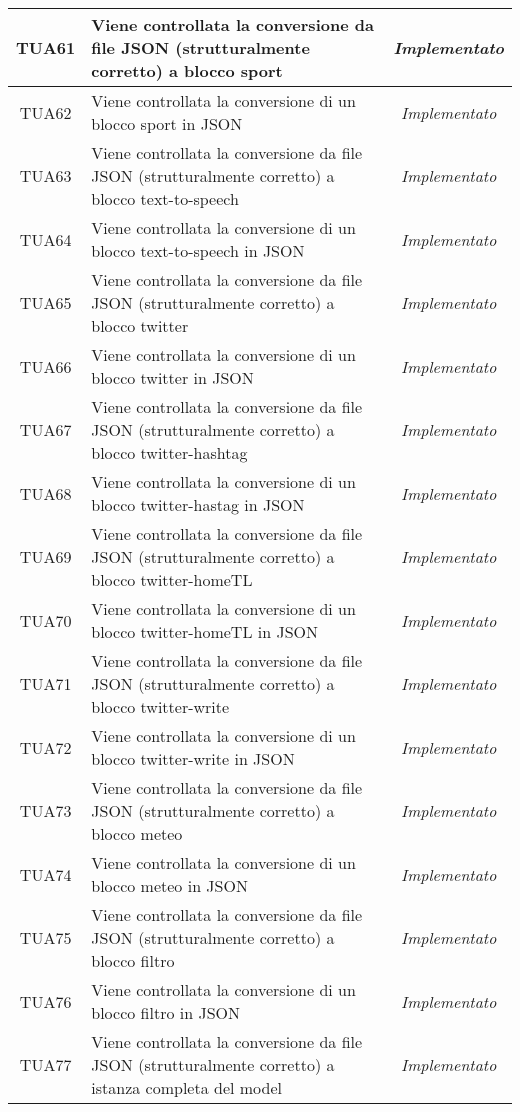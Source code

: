 \begin{longtable}{|c|m{12em}|c|}
TUA61 & Viene controllata la conversione da file JSON (strutturalmente corretto) a blocco sport& \textit{Implementato}\\ \hline
TUA62 & Viene controllata la conversione di un blocco sport in JSON& \textit{Implementato}\\ \hline
TUA63 & Viene controllata la conversione da file JSON (strutturalmente corretto) a blocco text-to-speech& \textit{Implementato}\\ \hline
TUA64 & Viene controllata la conversione di un blocco text-to-speech in JSON& \textit{Implementato}\\ \hline
TUA65 & Viene controllata la conversione da file JSON (strutturalmente corretto) a blocco twitter& \textit{Implementato}\\ \hline
TUA66 & Viene controllata la conversione di un blocco twitter in JSON& \textit{Implementato}\\ \hline
TUA67 & Viene controllata la conversione da file JSON (strutturalmente corretto) a blocco twitter-hashtag& \textit{Implementato}\\ \hline
TUA68 & Viene controllata la conversione di un blocco twitter-hastag in JSON& \textit{Implementato}\\ \hline
TUA69 & Viene controllata la conversione da file JSON (strutturalmente corretto) a blocco twitter-homeTL& \textit{Implementato}\\ \hline
TUA70 & Viene controllata la conversione di un blocco twitter-homeTL in JSON& \textit{Implementato}\\ \hline
TUA71 & Viene controllata la conversione da file JSON (strutturalmente corretto) a blocco twitter-write& \textit{Implementato}\\ \hline
TUA72 & Viene controllata la conversione di un blocco twitter-write in JSON& \textit{Implementato}\\ \hline
TUA73 & Viene controllata la conversione da file JSON (strutturalmente corretto) a blocco meteo& \textit{Implementato}\\ \hline
TUA74 & Viene controllata la conversione di un blocco meteo in JSON& \textit{Implementato}\\ \hline
TUA75 & Viene controllata la conversione da file JSON (strutturalmente corretto) a blocco filtro& \textit{Implementato}\\ \hline
TUA76 & Viene controllata la conversione di un blocco filtro in JSON& \textit{Implementato}\\ \hline
TUA77 & Viene controllata la conversione da file JSON (strutturalmente corretto) a istanza completa del model& \textit{Implementato}\\ \hline

\end{longtable}
